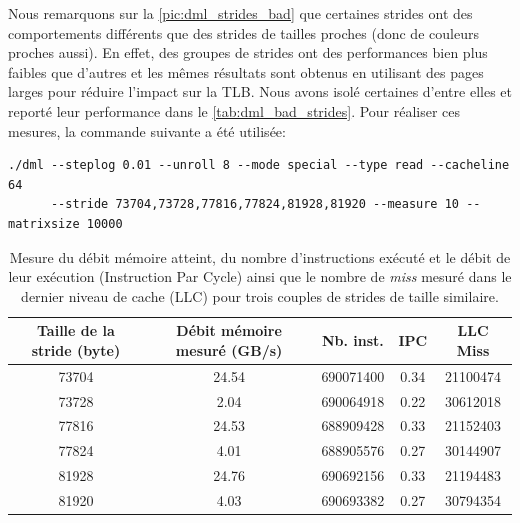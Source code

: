         Nous remarquons sur la \autoref{pic:dml_strides_bad} que certaines \glspl{stride} ont des comportements différents que des strides de tailles proches (donc de couleurs proches aussi). En effet, des groupes de strides ont des performances bien plus faibles que d'autres et les mêmes résultats sont obtenus en utilisant des pages larges pour réduire l'impact sur la TLB. Nous avons isolé certaines d'entre elles et reporté leur performance dans le  \autoref{tab:dml_bad_strides}. Pour réaliser ces mesures, la commande suivante a été utilisée: 
        \begin{verbatim}
./dml --steplog 0.01 --unroll 8 --mode special --type read --cacheline 64 
      --stride 73704,73728,77816,77824,81928,81920 --measure 10 --matrixsize 10000
        \end{verbatim}
        
        
        \begin{table}[h!]
        \centering
        \begin{tabular}{|c|c|c|c|c|}
        \hline
        \rowcolor[HTML]{EFEFEF} 
        Taille de la stride (byte) & Débit mémoire mesuré (GB/s) & Nb. inst. & IPC & LLC Miss \\ \hline
        \rowcolor[HTML]{FFFFC7} 
        73704 & 24.54 & 690071400 & 0.34 & 21100474 \\ \hline
        \rowcolor[HTML]{FFFFC7} 
        73728 & 2.04 & 690064918 & 0.22 & 30612018 \\ \hline
        \rowcolor[HTML]{E8FFFE} 
        77816 & 24.53 & 688909428 & 0.33 & 21152403 \\ \hline
        \rowcolor[HTML]{E8FFFE} 
        77824 & 4.01 & 688905576 & 0.27 & 30144907 \\ \hline
        \rowcolor[HTML]{E6FFE6} 
        81928 & 24.76 & 690692156 & 0.33 & 21194483 \\ \hline
        \rowcolor[HTML]{E6FFE6} 
        81920 & 4.03 & 690693382 & 0.27 & 30794354 \\ \hline
        \end{tabular}%
        \caption{Mesure du débit mémoire atteint, du nombre d'instructions exécuté et le débit de leur exécution (Instruction Par Cycle) ainsi que le nombre de \textit{miss} mesuré dans le dernier niveau de cache (LLC) pour trois couples de strides de taille similaire.}
        \label{tab:dml_bad_strides}
        \end{table}
        
